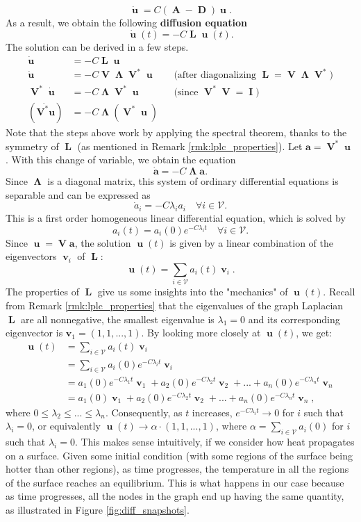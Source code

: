 \documentclass[12pt, oneside]{report}   	%
\DeclareMathOperator{\Adj}{\boldsymbol{A}}
\DeclareMathOperator{\Lplc}{\boldsymbol{L}}
\DeclareMathOperator{\Id}{\boldsymbol{I}}
\DeclareMathOperator{\DD}{\boldsymbol{D}}
\DeclareMathOperator{\uu}{\boldsymbol{u}}
\DeclareMathOperator{\vv}{\boldsymbol{v}}
\DeclareMathOperator{\VV}{\boldsymbol{V}}
\DeclareMathOperator{\LLambda}{\boldsymbol{\Lambda}}
\begin{document}
$$
\dot{\uu} = C(\Adj - \DD)\uu.
$$
As a result, we obtain the following \textbf{diffusion equation}
\begin{equation}
\label{eq:diff}
\dot{\uu}(t) = -C\Lplc\uu(t).
\end{equation}
The solution can be derived in a few steps.
\begin{align*}
\dot{\uu} &= -C\Lplc\uu \\
\dot{\uu} &= -C\VV\LLambda\VV^*\uu && \text{(after diagonalizing $\Lplc=\VV\LLambda\VV^*$)} \\
\VV^*\dot{\uu} &= -C\LLambda\VV^*\uu && \text{(since $\VV^*\VV=\Id$)} \\
(\dot{\boldsymbol{V^*u}}) &= -C\LLambda(\VV^*\uu)
\end{align*}
Note that the steps above work by applying the spectral theorem, thanks to the symmetry of $\Lplc$ (as mentioned in Remark \ref{rmk:lplc_properties}). Let $\boldsymbol{a}=\VV^*\uu$. With this change of variable, we obtain the equation
$$
\boldsymbol{\dot{a}} = -C\LLambda\boldsymbol{a}.
$$
Since $\LLambda$ is a diagonal matrix, this system of ordinary differential equations is separable and can be expressed as 
$$
\dot{a}_i = -C\lambda_i a_i \quad \forall i\in\mathcal{V}.
$$
This is a first order homogeneous linear differential equation, which is solved by
$$
a_i(t) = a_i(0)e^{-C\lambda_i t} \quad \forall i\in\mathcal{V}.
$$
Since $\uu=\VV\boldsymbol{a}$, the solution $\uu(t)$ is given by a linear combination of the eigenvectors $\vv_i$ of $\Lplc$:
$$
\uu(t) = \sum_{i\in\mathcal{V}} a_i(t) \vv_i.
$$
The properties of $\Lplc$ give us some insights into the "mechanics" of $\uu(t)$. Recall from Remark \ref{rmk:lplc_properties} that the eigenvalues of the graph Laplacian $\Lplc$ are all nonnegative, the smallest eigenvalue is $\lambda_1=0$ and its corresponding eigenvector is $\boldsymbol{v}_1=(1,1,...,1)$. By looking more closely at $\uu(t)$, we get:
\begin{align*}
\uu(t) &= \sum_{i\in\mathcal{V}} a_i(t) \vv_i \\
&= \sum_{i\in\mathcal{V}} a_i(0)e^{-C\lambda_i t} \vv_i \\
&= a_1(0)e^{-C\lambda_1 t} \vv_1 + a_2(0)e^{-C\lambda_2 t} \vv_2 + ... + a_n(0)e^{-C\lambda_n t} \vv_n \\
&= a_1(0)\vv_1 + a_2(0)e^{-C\lambda_2 t} \vv_2 + ... + a_n(0)e^{-C\lambda_n t} \vv_n,
\end{align*}
where $0\leq\lambda_2\leq...\leq\lambda_n$. Consequently, as $t$ increases, $e^{-C\lambda_i t}\rightarrow0$ for $i$ such that $\lambda_i=0$, or equivalently $\uu(t)\rightarrow \alpha \cdot(1,1,...,1)$, where $\alpha=\sum_{i\in\mathcal{V}}a_i(0)$ for $i$ such that $\lambda_i=0$. This makes sense intuitively, if we consider how heat propagates on a surface. Given some initial condition (with some regions of the surface being hotter than other regions), as time progresses, the temperature in all the regions of the surface reaches an equilibrium. This is what happens in our case because as time progresses, all the nodes in the graph end up having the same quantity, as illustrated in Figure \ref{fig:diff_snapshots}.
\end{document}
